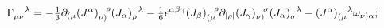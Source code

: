 \begin{equation}
\label{3.5}
\Gamma_{\mu\nu}^{~~~\lambda} = - \hbox{$\frac{1}{3}$}
\partial_{(\mu} (J^\alpha)_{\nu)}^{~~\rho} (J_\alpha)_\rho^{\!~~\lambda} -
\hbox{$\frac{1}{6}$} \epsilon^{\alpha\beta\gamma} (J_\beta)_{(\mu}^{~~\rho}
\partial_{|\rho|} (J_\gamma)_{\nu)}^{~~\sigma}
(J_\alpha)_\sigma^{\!~~\lambda} -
(J^\alpha)_{(\mu}^{\!~~~\lambda} \omega_{\nu) \alpha};
\end{equation}

